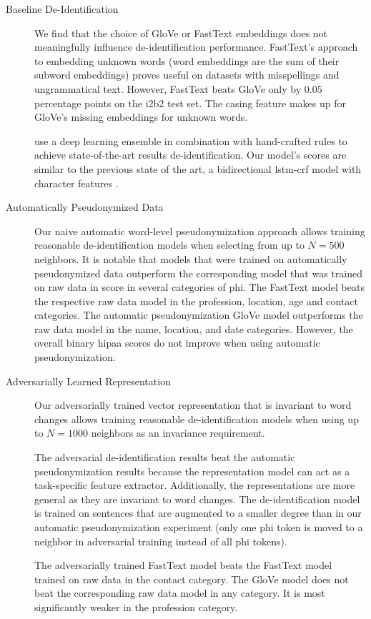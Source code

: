 \begin{description}
    \item[Baseline De-Identification]
    We find that the choice of GloVe or FastText embeddings does not meaningfully influence de-identification performance.
    FastText's approach to embedding unknown words (word embeddings are the sum of their subword embeddings) proves useful on datasets with misspellings and ungrammatical text.
    However, FastText beats GloVe only by $0.05$ percentage points on the i2b2 test set.
    The casing feature makes up for GloVe's missing embeddings for unknown words.
    
    \citet{liu2017identification} use a deep learning ensemble in combination with hand-crafted rules to achieve state-of-the-art results de-identification.
    Our model's scores are similar to the previous state of the art, a bidirectional \ac{lstm}-\ac{crf} model with character features \citep{dernoncourt2017identification}.
    

    \item[Automatically Pseudonymized Data]
    Our naive automatic word-level pseudonymization approach allows training reasonable de-identification models when selecting from up to $N=500$ neighbors.
    It is notable that models that were trained on automatically pseudonymized data outperform the corresponding model that was trained on raw data in \fone score in several categories of \ac{phi}.
    The FastText model beats the respective raw data model in the profession, location, age and contact categories.
    The automatic pseudonymization GloVe model outperforms the raw data model in the name, location, and date categories.
    However, the overall binary \ac{hipaa} \fone scores do not improve when using automatic pseudonymization.
    
    \item[Adversarially Learned Representation]
    Our adversarially trained vector representation that is invariant to word changes allows training reasonable de-identification models when using up to $N=1000$ neighbors as an invariance requirement.
    
    The adversarial de-identification results beat the automatic pseudonymization results because the representation model can act as a task-specific feature extractor.
    Additionally, the representations are more general as they are invariant to word changes.
    The de-identification model is trained on sentences that are augmented to a smaller degree than in our automatic pseudonymization experiment (only one \ac{phi} token is moved to a neighbor in adversarial training instead of all \ac{phi} tokens).
    
    The adversarially trained FastText model beats the FastText model trained on raw data in the contact category. 
    The GloVe model does not beat the corresponding raw data model in any category.
    It is most significantly weaker in the profession category.
\end{description}

